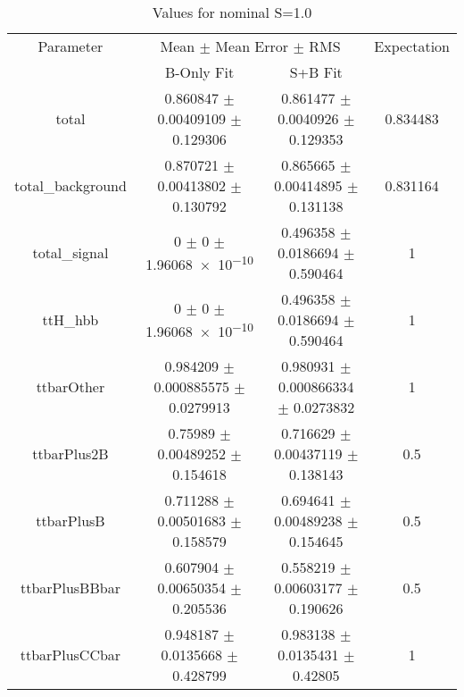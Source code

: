 \begin{table}
\centering
\caption{Values for nominal S=1.0}
\begin{tabular}{cccc}
\toprule
Parameter & \multicolumn{2}{c}{Mean $\pm$ Mean Error $\pm$ RMS} & Expectation\\
 & B-Only Fit & S+B Fit & \\
\midrule
total & \num{0.860847} $\pm$ \num{0.00409109} $\pm$ \num{0.129306} & \num{0.861477} $\pm$ \num{0.0040926} $\pm$ \num{0.129353} & \num{0.834483}\\
total\_background & \num{0.870721} $\pm$ \num{0.00413802} $\pm$ \num{0.130792} & \num{0.865665} $\pm$ \num{0.00414895} $\pm$ \num{0.131138} & \num{0.831164}\\
total\_signal & \num{0} $\pm$ \num{0} $\pm$ \num{1.96068e-10} & \num{0.496358} $\pm$ \num{0.0186694} $\pm$ \num{0.590464} & \num{1}\\
ttH\_hbb & \num{0} $\pm$ \num{0} $\pm$ \num{1.96068e-10} & \num{0.496358} $\pm$ \num{0.0186694} $\pm$ \num{0.590464} & \num{1}\\
ttbarOther & \num{0.984209} $\pm$ \num{0.000885575} $\pm$ \num{0.0279913} & \num{0.980931} $\pm$ \num{0.000866334} $\pm$ \num{0.0273832} & \num{1}\\
ttbarPlus2B & \num{0.75989} $\pm$ \num{0.00489252} $\pm$ \num{0.154618} & \num{0.716629} $\pm$ \num{0.00437119} $\pm$ \num{0.138143} & \num{0.5}\\
ttbarPlusB & \num{0.711288} $\pm$ \num{0.00501683} $\pm$ \num{0.158579} & \num{0.694641} $\pm$ \num{0.00489238} $\pm$ \num{0.154645} & \num{0.5}\\
ttbarPlusBBbar & \num{0.607904} $\pm$ \num{0.00650354} $\pm$ \num{0.205536} & \num{0.558219} $\pm$ \num{0.00603177} $\pm$ \num{0.190626} & \num{0.5}\\
ttbarPlusCCbar & \num{0.948187} $\pm$ \num{0.0135668} $\pm$ \num{0.428799} & \num{0.983138} $\pm$ \num{0.0135431} $\pm$ \num{0.42805} & \num{1}\\
\bottomrule
\end{tabular}
\end{table}